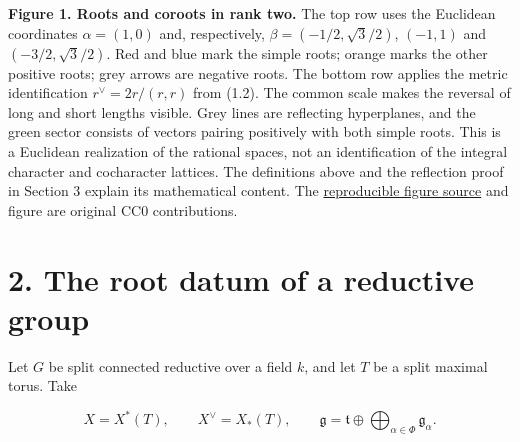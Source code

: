 \documentclass[11pt,a4paper,openany]{report}
\begin{document}
\begin{center}
\end{center}

\textbf{Figure 1. Roots and coroots in rank two.} The top row uses the Euclidean coordinates \(\alpha=(1,0)\) and, respectively, \(\beta=(-1/2,\sqrt3/2)\), \((-1,1)\) and \((-3/2,\sqrt3/2)\). Red and blue mark the simple roots; orange marks the other positive roots; grey arrows are negative roots. The bottom row applies the metric identification \(r^\vee=2r/(r,r)\) from (1.2). The common scale makes the reversal of long and short lengths visible. Grey lines are reflecting hyperplanes, and the green sector consists of vectors pairing positively with both simple roots. This is a Euclidean realization of the rational spaces, not an identification of the integral character and cocharacter lattices. The definitions above and the reflection proof in Section 3 explain its mathematical content. The \href{https://github.com/KokunoYumeto/open-math-courses/blob/main/docs/courses/AG-RG/figure_sources/rank_two_roots.py}{reproducible figure source} and figure are original CC0 contributions.

\section{2. The root datum of a reductive group}\label{AG-RG-04-the-root-datum-of-a-reductive-group}

Let \(G\) be split connected reductive over a field \(k\), and let \(T\) be a split maximal torus. Take

\[
X=X^*(T),\qquad X^\vee=X_*(T),\qquad
\mathfrak g=\mathfrak t\oplus\bigoplus_{\alpha\in\Phi}\mathfrak g_\alpha.
\]
\end{document}
